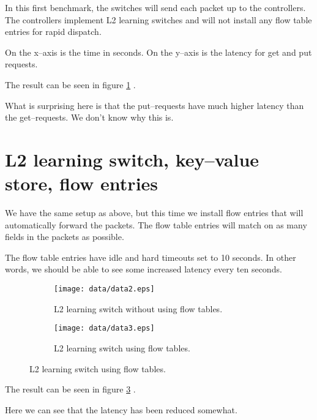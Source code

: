 In this first benchmark, the switches will send each packet up to the
controllers.  The controllers implement L2 learning switches and will not
install any flow table entries for rapid dispatch.

On the x--axis is the time in seconds.  On the y--axis is the latency for
get and put requests.

The result can be seen in figure \ref{benchmark:l2.learning.switch.no.flows} 
.

What is surprising here is that the put--requests have much higher latency
than the get--requests. We don't know why this is.

\section{L2 learning switch, key--value store, flow entries}

We have the same setup as above, but this time we install flow entries that
will automatically forward the packets.  The flow table entries will match
on as many fields in the packets as possible.

The flow table entries have idle and hard timeouts set to 10 seconds.
In other words, we should be able to see some increased latency every ten
seconds.

\begin{figure}
  \centering
  \begin{subfigure}{\textwidth}
    \centering
    \texttt{[image: data/data2.eps]}
    \caption{L2 learning switch without using flow tables.}
    \label{benchmark:l2.learning.switch.no.flows}
  \end{subfigure}

  \centering
  \begin{subfigure}{\textwidth}
    \centering
    \texttt{[image: data/data3.eps]}
    \caption{L2 learning switch using flow tables.}
    \label{benchmark:l2.learning.switch.with.flows}
  \end{subfigure}
\end{figure}

The result can be seen in figure \ref{benchmark:l2.learning.switch.with.flows}
.

Here we can see that the latency has been reduced somewhat.

